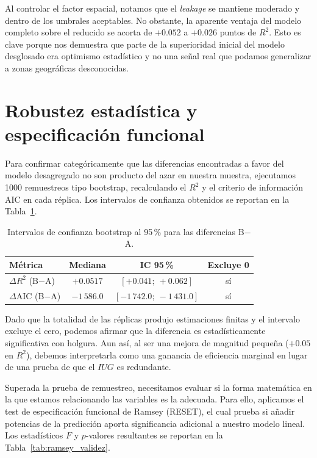 \documentclass[12pt, a4paper, twoside, openright]{report}
\theoremstyle{plain}
\theoremstyle{definition}
\newcommand{\IUG}{IUG}             %
\begin{document}
Al controlar el factor espacial, notamos que el \emph{leakage} se mantiene moderado y dentro de los umbrales aceptables. No obstante, la aparente ventaja del modelo completo sobre el reducido se acorta de $+0.052$ a $+0.026$ puntos de $R^2$. Esto es clave porque nos demuestra que parte de la superioridad inicial del modelo desglosado era optimismo estadístico y no una señal real que podamos generalizar a zonas geográficas desconocidas.

\section{Robustez estadística y especificación funcional}\label{sec:robustez}

Para confirmar categóricamente que las diferencias encontradas a favor del modelo desagregado no son producto del azar en nuestra muestra, ejecutamos \num{1000} remuestreos tipo bootstrap, recalculando el $R^2$ y el criterio de información AIC en cada réplica. Los intervalos de confianza obtenidos se reportan en la Tabla~\ref{tab:bootstrap_validez}.

\begin{table}[htbp]
\centering
\caption{Intervalos de confianza bootstrap al 95\,\% para las diferencias B$-$A.}
\label{tab:bootstrap_validez}
\small
\begin{tabular}{@{}lccc@{}}
\toprule
\textbf{Métrica} & \textbf{Mediana} & \textbf{IC 95\,\%} & \textbf{Excluye 0} \\
\midrule
$\Delta R^2$ (B$-$A) & $+0.0517$ & $[+0.041;\ +0.062]$ & sí \\
$\Delta$AIC (B$-$A)  & $-1\,586.0$ & $[-1\,742.0;\ -1\,431.0]$ & sí \\
\bottomrule
\end{tabular}
\end{table}

Dado que la totalidad de las réplicas produjo estimaciones finitas y el intervalo excluye el cero, podemos afirmar que la diferencia es estadísticamente significativa con holgura. Aun así, al ser una mejora de magnitud pequeña ($+0.05$ en $R^2$), debemos interpretarla como una ganancia de eficiencia marginal en lugar de una prueba de que el $\IUG$ es redundante.

Superada la prueba de remuestreo, necesitamos evaluar si la forma matemática en la que estamos relacionando las variables es la adecuada. Para ello, aplicamos el test de especificación funcional de Ramsey (RESET), el cual prueba si añadir potencias de la predicción aporta significancia adicional a nuestro modelo lineal. Los estadísticos $F$ y $p$-valores resultantes se reportan en la Tabla~\ref{tab:ramsey_validez}.
       
\end{document}
